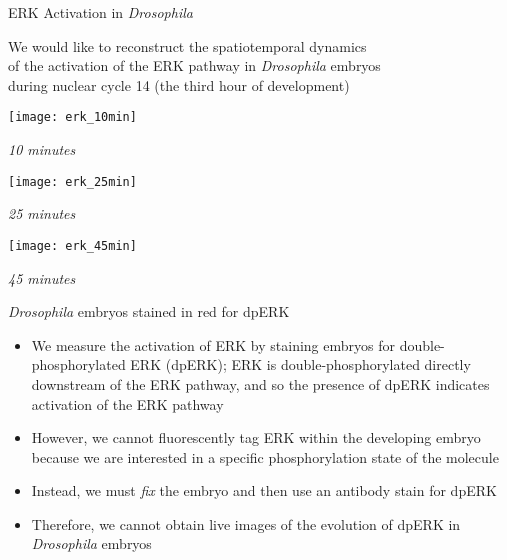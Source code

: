 \begin{frame}{ERK Activation in {\em Drosophila}}
	
	\centering
	We would like to reconstruct the spatiotemporal dynamics \\
	of the activation of the ERK pathway in {\em Drosophila} embryos\\
	during nuclear cycle 14 (the third hour of development)

    \centering
	\begin{minipage}{0.3\textwidth}
	    \texttt{[image: erk\_10min]}\\
	    {\scriptsize \em 10 minutes \par}
	\end{minipage}
	\begin{minipage}{0.3\textwidth}
	    \texttt{[image: erk\_25min]}\\
	    {\scriptsize \em 25 minutes \par}
	\end{minipage}
	\begin{minipage}{0.3\textwidth}
	    \texttt{[image: erk\_45min]}\\
	    {\scriptsize \em 45 minutes \par}
	\end{minipage}
	
	{\scriptsize {\em Drosophila} embryos stained in red for dpERK}
	
	\begin{itemize}
		\item We measure the activation of ERK by staining embryos for double-phosphorylated ERK (dpERK); ERK is double-phosphorylated  directly downstream of the ERK pathway, and so the presence of dpERK indicates activation of the ERK pathway
	
		\item However, we cannot fluorescently tag ERK within the developing embryo because we are interested in a specific phosphorylation state of the molecule
		
		\item Instead, we must {\em fix} the embryo and then use an antibody stain for dpERK
	
		\item Therefore, we cannot obtain live images of the evolution of dpERK in {\em Drosophila} embryos
	\end{itemize}
	
\end{frame}

